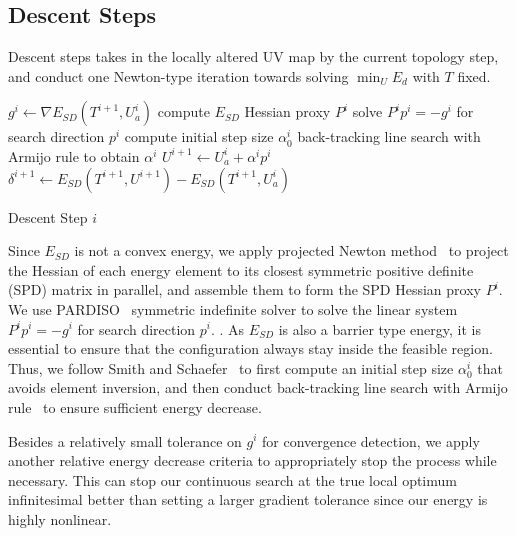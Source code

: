 
\subsection{Descent Steps}
\label{sec:descentStep}

Descent steps takes in the locally altered UV map by the current topology step, and conduct one Newton-type iteration towards solving $\min_U E_d$ with $T$ fixed.

\begin{algorithm}[h]
\SetAlgoLined
{}
$g^{i} \leftarrow \nabla E_{SD}(T^{i+1}, U_a^{i})$\;
compute $E_{SD}$ Hessian proxy $P^i$\;
solve $P^i p^i = -g^i$ for search direction $p^i$\;
compute initial step size $\alpha^i_0$\;
back-tracking line search with Armijo rule to obtain $\alpha^i$\;
$U^{i+1} \leftarrow U_a^i + \alpha^i p^i$\;
$\delta^{i+1} \leftarrow E_{SD}(T^{i+1}, U^{i+1}) - E_{SD}(T^{i+1}, U_a^{i})$\;
\caption{Descent Step $i$}
\label{alg:descentStep}
\end{algorithm}
Since $E_{SD}$ is not a convex energy, we apply projected Newton method~\cite{Teran2005Robust} to project the Hessian of each energy element to its closest symmetric positive definite (SPD) matrix in parallel, and assemble them to form the SPD Hessian proxy $P^i$. We use PARDISO~\cite{pardiso-6.0a, pardiso-6.0b} symmetric indefinite solver to solve the linear system $P^i p^i = -g^i$ for search direction $p^i$. . As $E_{SD}$ is also a barrier type energy, it is essential to ensure that the configuration always stay inside the feasible region. Thus, we follow Smith and Schaefer~ to first compute an initial step size $\alpha^i_0$ that avoids element inversion, and then conduct back-tracking line search with Armijo rule~\cite{Armijo1966Minimization} to ensure sufficient energy decrease.

Besides a relatively small tolerance on $g^i$ for convergence detection, we apply another relative energy decrease criteria to appropriately stop the process while necessary.
This can stop our continuous search at the true local optimum infinitesimal better than setting a larger gradient tolerance since our energy is highly nonlinear. 

